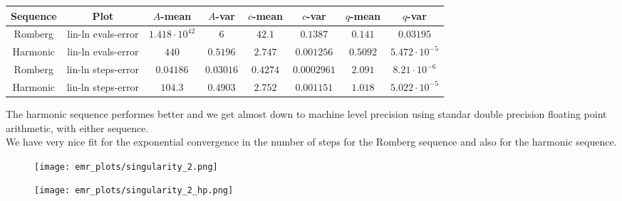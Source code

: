 \begin{table}[H]
    \centering
    \small
     \begin{tabular}{c|c||c|c|c|c|c|c}
Sequence & Plot & \(A\)-mean & \(A\)-var & \(c\)-mean & \(c\)-var & \(q\)-mean & \(q\)-var\\\hline
Romberg & lin-ln evals-error & \(1.418\cdot 10^{42}\) & \(6\) & \(42.1\) & \(0.1387\) & \(0.141\) & \(0.03195\) \\
Harmonic & lin-ln evals-error & \(440\) & \(0.5196\) & \(2.747\) & \(0.001256\) & \(0.5092\) & \(5.472\cdot 10^{-5}\) \\
Romberg & lin-ln steps-error & \(0.04186\) & \(0.03016\) & \(0.4274\) & \(0.0002961\) & \(2.091\) & \(8.21\cdot 10^{-6}\) \\
Harmonic & lin-ln steps-error & \(104.3\) & \(0.4903\) & \(2.752\) & \(0.001151\) & \(1.018\) & \(5.022\cdot 10^{-5}\) \\
    \end{tabular}
    \label{tab:my_label}
\end{table}

The harmonic sequence performes better and we get almost down to machine level precision using standar double precision floating point arithmetic, with either sequence.\\

We have very nice fit for the exponential convergence in the number of steps for the Romberg sequence and also for the harmonic sequence.

\begin{figure}[H]
\centering
\begin{minipage}{0.45\textwidth}
\centering
\texttt{[image: emr\_plots/singularity\_2.png]}
\end{minipage}
\begin{minipage}{0.45\textwidth}
\centering
\texttt{[image: emr\_plots/singularity\_2\_hp.png]}
\end{minipage}
\end{figure}

